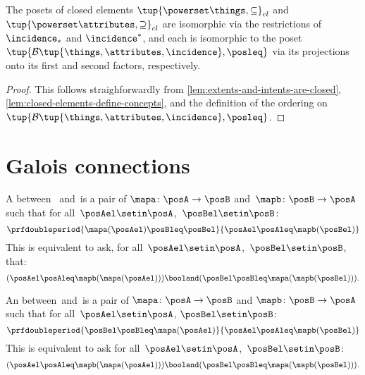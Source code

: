 \begin{lemma}
The posets of closed elements $\tup{\powerset \things, \subseteq}_{cl}$ and $\tup{\powerset \attributes, \supseteq}_{cl}$ are isomorphic via the restrictions of $\incidence_*$ and $\incidence^*$, and each is isomorphic to the poset $\tup{\mathcal{B}\tup{\things, \attributes, \incidence}, \posleq}$ via its projections onto its first and second factors, respectively.
\end{lemma}

\begin{proof}
This follows straighforwardly from \cref{lem:extents-and-intents-are-closed}, \cref{lem:closed-elements-define-concepts}, and the definition of the ordering on $\tup{\mathcal{B}\tup{\things, \attributes, \incidence}, \posleq}$. 
\end{proof}

\section{Galois connections}\label{sec:galois-connections}

\begin{ctdefinition}\label{def:monotone-galois-connection}
    A  between ~\posA and~\posB is a pair of 
    $\mapa\colon \posA\to \posB$ and~$\mapb\colon \posB\to \posA$ such that for all~$\posAel\setin \posA$,~$\posBel\setin \posB$:
    \begin{equation}
        \prfdoubleperiod{\mapa(\posAel) \posBleq \posBel}{\posAel \posAleq \mapb(\posBel)}
    \end{equation}
    This is equivalent to ask, for all~$\posAel\setin \posA$,~$\posBel\setin \posB$, that:
    \begin{equation}
        (\posAel\posAleq \mapb(\mapa(\posAel)))
        \booland (\posBel\posBleq \mapa(\mapb(\posBel))).
    \end{equation}
\end{ctdefinition}

\begin{ctdefinition}\label{def:antitone-galois-connection}
    An  between~\posA and~\posB is a pair of  $\mapa\colon \posA\to \posB$ and $\mapb \colon \posB\to \posA$ such that for all~$\posAel\setin \posA$, $\posBel\setin \posB$:
    \begin{equation}
        \prfdoubleperiod{\posBel \posBleq \mapa(\posAel)}{\posAel \posAleq \mapb(\posBel)}
    \end{equation}
    This is equivalent to ask for all~$\posAel\setin \posA$,~$\posBel\setin \posB$:
    \begin{equation}
        (\posAel \posAleq \mapb(\mapa(\posAel)))
        \booland (\posBel \posBleq \mapa(\mapb(\posBel))).
    \end{equation}
\end{ctdefinition}

